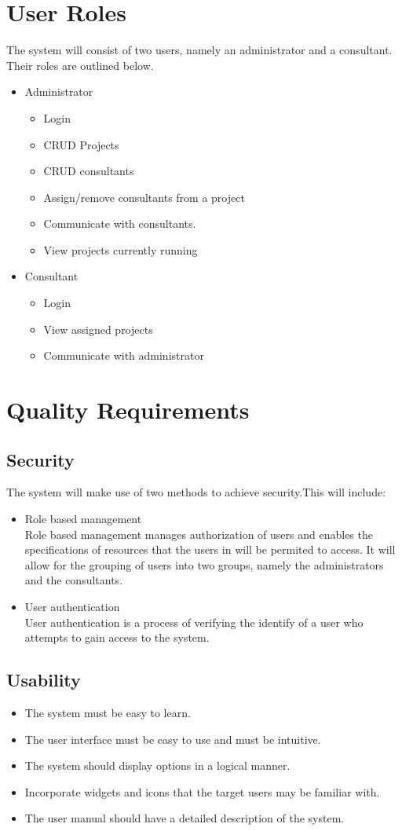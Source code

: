 \documentclass[a4paper, 12pt, oneside]{article}
\begin{document}
\section{User Roles}
The system will consist of two users, namely an administrator and a consultant. Their roles are outlined below.
\begin{itemize}
\item Administrator
\begin{itemize}
\item Login
\item CRUD Projects
\item CRUD consultants
\item Assign/remove consultants from a project
\item Communicate with consultants.
\item View projects currently running
\end{itemize}
\item Consultant
\begin{itemize}
\item Login
\item View assigned projects
\item Communicate with administrator
\end{itemize}
\end{itemize}

\section{Quality Requirements}
\subsection{Security}
The system will make use of two methods to achieve security.This will include:
\begin{itemize}
\item Role based management\\ Role based management manages authorization of users and enables the specifications of resources that the users in will be permited to access. It will allow for the grouping of users into two groups, namely the administrators and the consultants.
\item User authentication\\
User authentication is a process of verifying the identify of a user who attempts to gain access to the system.
\end{itemize}
\subsection{Usability}
\begin{itemize}
	\item The system must be easy to learn.
	\item The user interface must be easy to use and must be intuitive.
	\item The system should display options in a logical manner.
	\item Incorporate widgets and icons that the target users may be familiar with.
	\item The user manual should have a detailed description of the system.
\end{itemize}
\end{document}
